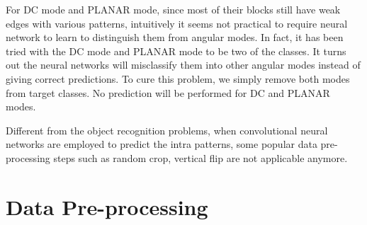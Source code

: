 For DC mode and PLANAR mode, since most of their blocks
still have weak edges with various patterns, 
intuitively it seems not practical to require 
neural network to learn to 
distinguish them from angular modes.
In fact, it has been tried with the DC mode and PLANAR
mode to be two of the classes.
It turns out the neural networks will misclassify 
them into other angular modes instead of giving 
correct predictions.
To cure this problem, we simply remove both modes
from target classes.
No prediction will be performed for DC and PLANAR modes.

Different from the object recognition problems,
when convolutional neural networks are employed to 
predict the intra patterns, some popular data pre-processing
steps such as random crop, vertical flip
are not applicable anymore.


\section{Data Pre-processing}\label{sec:data-preprocessing}
%
%
%
%
